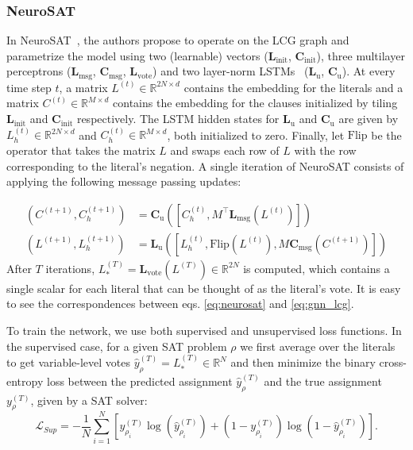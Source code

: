 \documentclass{article}
\newcommand\Flip{\mathrm{Flip}}
\newcommand\uscore[2]{\mathbf{#1}_{\text{#2}}}
\begin{document}
\subsubsection{NeuroSAT}
In NeuroSAT~\cite{Selsam2019}, the authors propose to operate on the LCG graph and parametrize the model using two (learnable) vectors
($\uscore{L}{init}$, $\uscore{C}{init}$), three multilayer perceptrons
($\uscore{L}{msg}$, $\uscore{C}{msg}$, $\uscore{L}{vote}$) and two
layer-norm LSTMs~\cite{ba2016layer,hochreiter1997long}
($\uscore{L}{u}$, $\uscore{C}{u}$).  At every time step $t$, a
matrix $L^{(t)} \in \mathbb{R}^{2N \times d}$ contains
the embedding for the literals and a matrix $C^{(t)} \in
\mathbb{R}^{M\times d}$ contains the embedding for
the clauses initialized by tiling $\uscore{L}{init}$ and
$\uscore{C}{init}$ respectively. The LSTM hidden states for $\uscore{L}{u}$ and $\uscore{C}{u}$ are given by
$L_h^{(t)} \in \mathbb{R}^{2N\times d}$ and $C_h^{(t)} \in
\mathbb{R}^{M\times d}$, both initialized to zero. Finally, let $\Flip$ be the operator that takes the matrix $L$ and swaps each row of $L$ with the row corresponding to the literal's negation. A single iteration of NeuroSAT consists of applying the following message passing updates:

\begin{equation}
\label{eq:neurosat}
\begin{aligned}
(C^{(t+1)}, C_h^{(t+1)}) & = \uscore{C}{u}( [ C_h^{(t)}, M^\top \uscore{L}{msg}(L^{(t)}) ] ) \\
  (L^{(t+1)}, L_h^{(t+1)}) & = \uscore{L}{u}([ L_h^{(t)}, \Flip(L^{(t)}), M \uscore{C}{msg}(C^{(t+1)}) ])
\end{aligned}
\end{equation}
After $T$ iterations, $L_*^{(T)} =
\uscore{L}{vote}(L^{(T)}) \in \mathbb{R}^{2N}$ is computed, which contains a
single scalar for each literal that can be thought of as the literal's
vote. It is easy to see the correspondences between eqs. \eqref{eq:neurosat} and \eqref{eq:gnn_lcg}.

To train the network, we use both supervised and unsupervised loss functions. In the supervised case, for a given SAT problem $\rho$ we first average over the literals to get variable-level votes $\hat{y}_{\rho}^{(T)} = L_*^{(T)} \in \mathbb{R}^N$ and then minimize the binary cross-entropy loss between the predicted assignment $\hat{y}_{\rho}^{(T)}$
and the true assignment $y_{\rho}^{(T)}$, given by a SAT solver:
\begin{equation}\label{eq:suploss}
    \mathcal{L}_{\textit{Sup}} = -\frac{1}{N} \sum_{i=1}^{N} \left[y_{\rho_i}^{(T)} \log(\hat{y}_{\rho_i}^{(T)}) + (1 - y_{\rho_i}^{(T)}) \log(1 - \hat{y}_{\rho_i}^{(T)})\right].
\end{equation}
\end{document}
